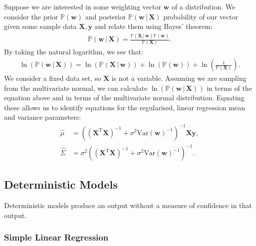 Suppose we are interested in some weighting vector $\mathbf{w}$ of 
a distribution. We consider the prior $\mathbb{P}(\mathbf{w})$
and posterior $\mathbb{P}(\mathbf{w} \, | \, \textbf{X})$ probability
of our vector given some sample data $\mathbf{X}, \mathbf{y}$ and 
relate them using Bayes' theorem: \begin{gather*}
    \mathbb{P}(\mathbf{w} \, | \, \mathbf{X})
    = \frac{
        \mathbb{P}(\mathbf{X} \, | \, \mathbf{w})\mathbb{P}(\mathbf{w})
    }{\mathbb{P}(\mathbf{X})}.
\end{gather*} By taking the natural logarithm, we see that:
\begin{gather*}
    \ln(\mathbb{P}(\mathbf{w} \, | \, \mathbf{X}))
    = \ln(\mathbb{P}(\mathbf{X} \, | \, \mathbf{w}))
    + \ln(\mathbb{P}(\mathbf{w}))
    + \ln\left(\frac{1}{\mathbb{P}(\mathbf{X})}\right).
\end{gather*} We consider a fixed data set, so $\mathbf{X}$ is not
a variable. Assuming we are sampling from the multivariate normal,
we can calculate 
$\ln(\mathbb{P}(\mathbf{w} \, | \, \mathbf{X}))$ in terms of
the equation above and in terms of the multivariate normal
distribution. Equating these allows us to identify equations
for the regularised, linear regression mean and variance parameters:
\begin{align*}
    \hat\mu &= ((\mathbf{X}^{\text{T}}\mathbf{X})^{-1}
    + \sigma^2 \text{Var}(\mathbf{w})^{-1})^{-1}\mathbf{X}\mathbf{y}, \\
    \hat\Sigma &= \sigma^2 ((\mathbf{X}^{\text{T}}\mathbf{X})^{-1}
    + \sigma^2 \text{Var}(\mathbf{w})^{-1})^{-1}.
\end{align*} 

\subsection{Deterministic Models}

Deterministic models produce an output without a measure of
confidence in that output.

\subsubsection{Simple Linear Regression}

